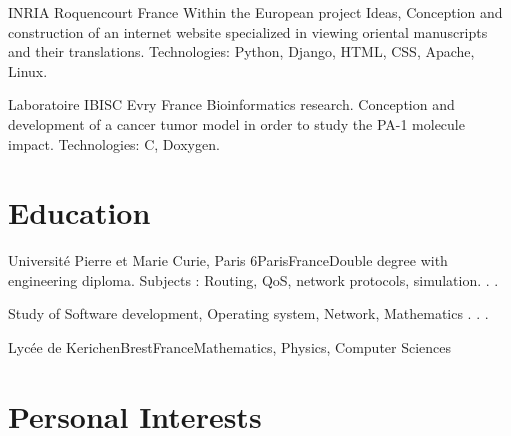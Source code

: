 \documentclass[11pt,a4paper,sans]{moderncv}        %
\begin{document}
              {INRIA}
              {Roquencourt}
              {France}
              {Within the European project Ideas, Conception and construction of an
               internet website specialized in viewing oriental manuscripts and their
               translations.
                 \newline Technologies: Python, Django, HTML, CSS, Apache, Linux.
              }

              {Laboratoire IBISC}
              {Evry}
              {France}
              {Bioinformatics research. Conception
               and development of a cancer tumor model in order to
               study the PA-1 molecule impact.
                \newline Technologies: C, Doxygen.
              }

\section{Education}
{Université Pierre et Marie Curie, Paris 6}{Paris}{France}{Double degree with engineering diploma. Subjects : Routing, QoS, network protocols, simulation. . .}

{Study of Software development, Operating system, Network, Mathematics . . .}

{Lycée de Kerichen}{Brest}{France}{Mathematics, Physics, Computer Sciences}

\section{Personal Interests}
\end{document}
